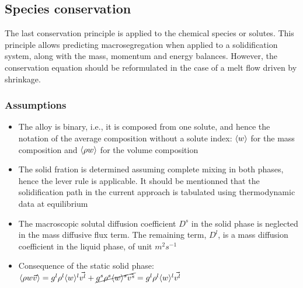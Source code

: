 \subsection{Species conservation}
The last conservation principle is applied to the chemical species or solutes. This principle allows predicting
macrosegregation when applied to a solidification system, along with the mass, momentum and energy balances.
However, the conservation equation should be reformulated in the case of a melt flow driven by shrinkage.
\subsubsection{Assumptions}
\begin{itemize}
\item The alloy is binary, i.e., it is composed from one solute, and hence the notation of the average composition
		without a solute index: $\langle w \rangle$ for the mass composition and $\langle \rho w \rangle$ for the volume composition
\item The solid fration is determined assuming complete mixing in both phases, hence the lever rule is applicable. It
		should be mentionned that the solidification path in the current approach is tabulated using thermodynamic data at 
		equilibrium
\item The macroscopic solutal diffusion coefficient $D^s$ in the solid phase is neglected in the mass diffusive flux term. The
		remaining term, $D^l$, is a mass diffusion coefficient in the liquid phase, of unit $m^2 s^{-1}$
\item Consequence of the static solid phase: $\langle \rho w \vec{v} \rangle = {g^l} \rho^l \langle w \rangle^l \vec{v^l} +  \cancel{{g^s} \rho^s \langle w \rangle^s \vec{v^s}} = {g^l} \rho^l \langle w \rangle^l \vec{v^l}$ 
\end{itemize}
